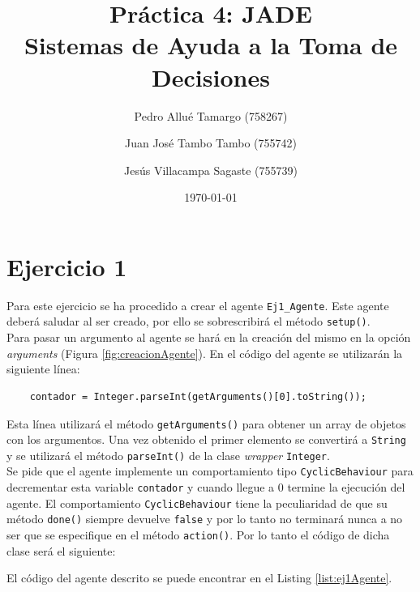 \documentclass[10pt,a4paper]{article}
\begin{document}
\begin{titlepage}
\title{\textbf{
	{\Huge  Práctica 4: JADE }\\
	{\Large Sistemas de Ayuda a la Toma de Decisiones }
}}
\author{
	Pedro Allué Tamargo (758267)
	\and
	Juan José Tambo Tambo (755742)
	\and
	Jesús Villacampa Sagaste (755739)
}
\date{\today}
\clearpage\maketitle
\thispagestyle{empty}
\end{titlepage}

\tableofcontents

\newpage
\section{Ejercicio 1}

Para este ejercicio se ha procedido a crear el agente \texttt{Ej1\_Agente}. Este agente deberá saludar al ser creado, por ello se sobrescribirá el método \texttt{setup()}.\\
Para pasar un argumento al agente se hará en la creación del mismo en la opción \emph{arguments} (Figura \ref{fig:creacionAgente}). En el código del agente se utilizarán la siguiente línea:

\begin{lstlisting}
	contador = Integer.parseInt(getArguments()[0].toString());
\end{lstlisting}

Esta línea utilizará el método \texttt{getArguments()} para obtener un array de objetos con los argumentos. Una vez obtenido el primer elemento se convertirá a \texttt{String} y se utilizará el método \texttt{parseInt()} de la clase \emph{wrapper} \texttt{Integer}.\\
Se pide que el agente implemente un comportamiento tipo \texttt{CyclicBehaviour} para decrementar esta variable \texttt{contador} y cuando llegue a 0 termine la ejecución del agente. El comportamiento \texttt{CyclicBehaviour} tiene la peculiaridad de que su método \texttt{done()} siempre devuelve \texttt{false} y por lo tanto no terminará nunca a no ser que se especifique en el método \texttt{action()}. Por lo tanto el código de dicha clase será el siguiente:



El código del agente descrito se puede encontrar en el Listing \ref{list:ej1Agente}.
\end{document}
